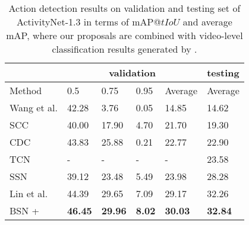 \documentclass[runningheads]{llncs}
\begin{document}
\begin{table}[tbp]
\setlength{\abovecaptionskip}{0.1cm} %
\centering
\caption{Action detection results on validation and testing set of ActivityNet-1.3 in terms of mAP@$tIoU$ and average mAP, where our proposals are combined with video-level classification results generated by \cite{zhao2017cuhk}.  }
\small
\begin{tabular}{p{2.8cm}p{1.4cm}<{\centering}p{1.4cm}<{\centering}p{1.4cm}<{\centering}p{1.5cm}<{\centering}p{1.6cm}<{\centering}}
\toprule
 & \multicolumn{4}{c}{validation} & testing  \\
\hline
Method  & 0.5  &  0.75  & 0.95  & Average  & Average  \\
\hline 
Wang et al. \cite{wang2016uts}    & 42.28 & 3.76  & 0.05   & 14.85 & 14.62 \\
SCC \cite{heilbron2017scc}   & 40.00 & 17.90  & 4.70   & 21.70 & 19.30 \\
CDC \cite{shou2017cdc}    & 43.83  & 25.88  & 0.21   & 22.77  & 22.90 \\
TCN \cite{dai2017temporal} & - & - & - & - & 23.58\\
SSN \cite{xiong2017pursuit}    & 39.12 & 23.48  & 5.49  & 23.98 & 28.28 \\
Lin et al. \cite{lin2017temporal} & 44.39   & 29.65  & 7.09  & 29.17 & 32.26 \\
\hline
BSN + \cite{zhao2017cuhk} & {\bf 46.45 }   & {\bf 29.96}  & {\bf 8.02}  & {\bf 30.03 } & {\bf 32.84 } \\
\bottomrule
\end{tabular}
\label{table_detection_anet}
\normalsize
\vspace{-0.1cm}                                                              
\end{table}
\end{document}
